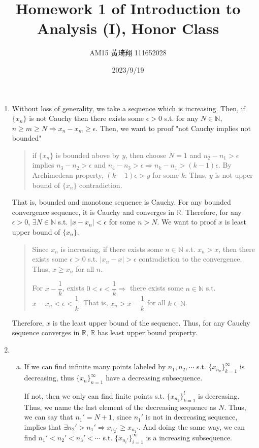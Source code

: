 \documentclass[12pt]{article}
\title{Homework 1 of Introduction to Analysis (I), Honor Class}
\author{AM15 黃琦翔 111652028}
\date{2023/9/19}
\begin{document}
\maketitle
\begin{enumerate}
    \item Without loss of generality, we take a sequence which is increasing. 
    Then, if $\lbrace x_n\rbrace$ is not Cauchy then there exists some $\epsilon > 0$ s.t. for any $N \in \mathbb{N}$, $n \geq m \geq N\Rightarrow x_n - x_m \geq \epsilon$.
    Then, we want to proof "not Cauchy implies not bounded"\begin{quote}
        if $\lbrace x_n\rbrace$ is bounded above by $y$, then choose $N = 1$ and $n_2 - n_1 > \epsilon$ implies $n_3 - n_2 > \epsilon$ and $n_4 - n_3 > \epsilon\Rightarrow n_k - n_1 > (k-1)\epsilon$.
        By Archimedean property, $(k-1)\epsilon > y$ for some $k$. Thus, $y$ is not upper bound of $\lbrace x_n \rbrace$ contradiction.
    \end{quote}
    That is, bounded and monotone sequence is Cauchy.
    For any bounded convergence sequence, it is Cauchy and converges in $\mathbb{R}$.
    Therefore, for any $\epsilon > 0$, $\exists N \in \mathbb{N}$ s.t. $|x - x_n| < \epsilon$ for some $n > N$.
    We want to proof $x$ is least upper bound of $\lbrace x_n\rbrace$.\begin{quote}
        Since $x_n$ is increasing, if there exists some $n \in\mathbb{N}$ s.t. $x_n > x$, 
        then there exists some $\epsilon > 0$ s.t. $|x_n -x| > \epsilon$ contradiction to the convergence.
        Thus, $x \geq x_n$ for all $n$.
        
        For $x - \dfrac{1}{k}$, exists $0 < \epsilon < \dfrac{1}{k}\Rightarrow$ there exists some $n \in \mathbb{N}$ s.t. $x - x_n < \epsilon < \dfrac{1}{k}$.
        That is, $x_n > x-\dfrac{1}{k}$ for all $k \in \mathbb{N}$.
    \end{quote}
    Therefore, $x$ is the least upper bound of the sequence.
    Thus, for any Cauchy sequence converges in $\mathbb{R}$, $\mathbb{R}$ has least upper bound property.

    \item \begin{enumerate}[(a)]
        \item If we can find infinite many points labeled by $n_1, n_2, \cdots$ s.t. $\lbrace x_{n_k}\rbrace_{k=1}^\infty$ is decreasing, thus $\lbrace x_n\rbrace_{n=1}^\infty$ have a decreasing subsequence.
        
        If not, then we only can find finite points s.t. $\lbrace x_{n_k}\rbrace_{k=1}^l$ is decreasing. Thus, we name the last element of the decreasing sequence as $N$.
        Thus, we can say that $n_1' = N + 1$, since $n_1'$ is not in decreasing sequence, implies that $\exists n_2' > n_1' \Rightarrow x_{n_2'} \geq x_{n_1'}$.
        And doing the same way,  we can find $n_1' < n_2' < n_3' < \cdots$ s.t. $\lbrace x_{n_i'}\rbrace_{i=1}^\infty$ is a increasing subsequence.


\end{enumerate}
\end{enumerate}
\end{document}
